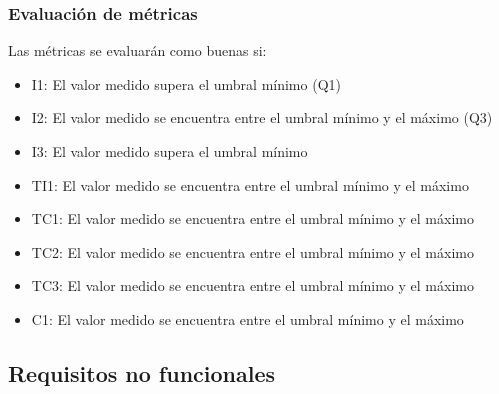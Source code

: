 \subsubsection{Evaluación de métricas}\label{sect:B_5_1_2}
Las métricas se evaluarán como buenas si:
\begin{itemize}
	\item I1: El valor medido supera el umbral mínimo (Q1)
	\item I2: El valor medido se encuentra entre el umbral mínimo y el máximo (Q3)
	\item I3: El valor medido supera el umbral mínimo
	\item TI1: El valor medido se encuentra entre el umbral mínimo y el máximo
	\item TC1: El valor medido se encuentra entre el umbral mínimo y el máximo
	\item TC2: El valor medido se encuentra entre el umbral mínimo y el máximo
	\item TC3: El valor medido se encuentra entre el umbral mínimo y el máximo
	\item C1: El valor medido se encuentra entre el umbral mínimo y el máximo
\end{itemize}

\subsection{Requisitos no funcionales}

